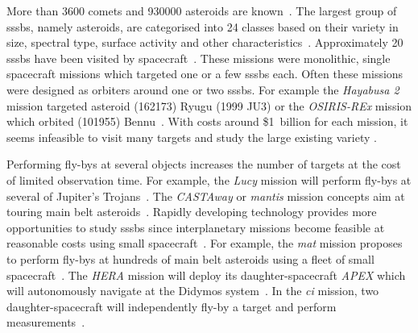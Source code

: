 More than \SI{3600}{} comets and \SI{930000}{} asteroids are known~\cite{nasaSBD_count, mpc2020}. The largest group of \glspl{sssb}, namely asteroids, are categorised into \SI{24}{} classes based on their variety in size, spectral type, surface activity and other characteristics~\cite{demeo2009extension}. Approximately \SI{20}{} \glspl{sssb} have been visited by spacecraft~\cite{nasaSBD_missions}. These missions were monolithic, single spacecraft missions which targeted one or a few \glspl{sssb} each. Often these missions were designed as orbiters around one or two \glspl{sssb}. For example the \textit{Hayabusa 2} mission targeted asteroid (162173) Ryugu (1999 JU3) or the \textit{OSIRIS-REx} mission which orbited (101955) Bennu~\cite{Watanabe2017Hayabusa2Overview, lauretta2017osiris}. With costs around \$1~billion for each mission, it seems infeasible to visit many targets and study the large existing variety \cite{ESARosettasQuestions, ArizonaOSIRIS-RExQuestions}.

Performing fly-bys at several objects increases the number of targets at the cost of limited observation time. For example, the \textit{Lucy} mission will perform fly-bys at several of Jupiter's Trojans~\cite{stanbridge2017lucy}. The \textit{CASTAway} or \textit{\gls{mantis}} mission concepts aim at touring main belt asteroids~\cite{bowles2018castaway, rivkin2016mainmantis}. Rapidly developing technology provides more opportunities to study \glspl{sssb} since interplanetary missions become feasible at reasonable costs using small spacecraft~\cite{Poghosyan2017CubeSatMissions, andrews2019asteroid, snodgrass2019europeanCI}. For example, the \textit{\gls{mat}} mission proposes to perform fly-bys at hundreds of main belt asteroids using a fleet of small spacecraft~\cite{Slavinskis2018NanospacecraftSails}. The \textit{HERA} mission will deploy its daughter-spacecraft \textit{APEX} which will autonomously navigate at the Didymos system~\cite{Kohout2018FeasibilityStudy}. In the \textit{\gls{ci}} mission, two daughter-spacecraft will independently fly-by a target and perform measurements~\cite{snodgrass2019europeanCI}.

